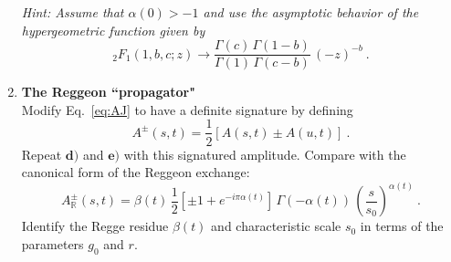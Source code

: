 \begin{enumerate}
\noindent \textit{Hint: Assume that $\alpha(0) > -1$ and use the asymptotic behavior of the hypergeometric function given by 
    \begin{equation}
        _2F_1(1,b,c;z) \to \frac{\Gamma(c)\,\Gamma(1-b)}{\Gamma(1) \,\Gamma(c-b)} \, (-z)^{-b}  ~.
    \end{equation}
}

\item \textbf{The Reggeon ``propagator"} \\
Modify Eq.~\ref{eq:AJ} to have a definite signature by defining
    \begin{equation}
        A^{\pm}(s,t) = \frac{1}{2}\left[A(s,t) \pm A(u,t) \right]~.
    \end{equation}
Repeat $\textbf{d)}$ and  $\textbf{e)}$ with this signatured amplitude. Compare with the canonical form of the Reggeon exchange:
    \begin{equation}
        A^\pm_\mathbb{R}(s,t) = \beta(t) \, \frac{1}{2}\left[\pm1 + e^{-i\pi\alpha(t)}\right] \, \Gamma(-\alpha(t)) \, \left(\frac{s}{s_0}\right)^{\alpha(t)} ~.
    \end{equation}
Identify the Regge residue $\beta(t)$ and characteristic scale $s_0$ in terms of the parameters $g_0$ and $r$. 

\end{enumerate}